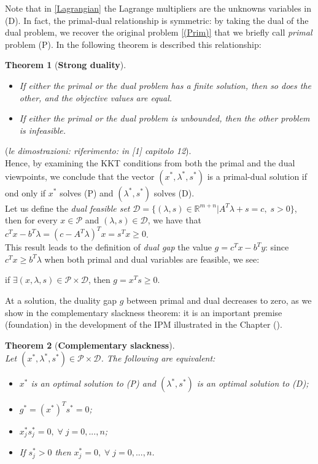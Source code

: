 \documentclass[a4paper,10 pt,titlepage,twoside]{book}
\theoremstyle{plain}
\newtheorem{thm}{Theorem}[chapter]
\theoremstyle{definition}
\theoremstyle{remark}
\begin{document}
Note that in \ref{Lagrangian} the Lagrange multipliers are the unknowns variables in (D). In fact, the primal-dual relationship is symmetric: by taking the dual of the dual problem, we recover the original problem \ref{(Prim)} that we briefly call \textit{primal} problem (P). In the following theorem is described this relationship:
\begin{thm}[\textbf{Strong duality}] 
	\begin{itemize}
		\
		\item If either the primal or the dual problem has a finite solution, then so does the other, and the objective values are equal.
		\item If either the primal or the dual problem is unbounded, then the other problem is infeasible.
	\end{itemize}
\end{thm}
(\textit{le dimostrazioni: riferimento: in [1] capitolo 12}).\\[0.5 cm] Hence, by examining the KKT conditions from both the primal and the dual viewpoints, we conclude that the vector $(x^{*},\lambda^{*},s^{*})$ is a primal-dual solution if ond only if $x^{*}$ solves (P) and $(\lambda^{*},s^{*})$ solves (D).\\[1cm]
Let us define the \textit{dual feasible set} $\mathcal{D}=\{(\lambda,s)\in\mathbb{R}^{m+n}| A^{T}\lambda+s= c,\;s>0\}$, then for every $x\in\mathcal{P}$ and $\left(\lambda,s\right)\in\mathcal{D}$, we have that $c^{T}x-b^{T}\lambda=\left(c-A^{T}\lambda\right)^{T}x=s^{T}x \geq0$.\\
This result leads to the definition of \textit{dual gap} the value $g = c^{T}x - b^{T}y$: since $c^{T}x\geq b^{T}\lambda$ when both primal and dual variables are feasible, we see:\begin{center}
	if $\exists(x,\lambda,s)\in\mathcal{P}\times\mathcal{D}$, then $g= x^{T}s \geq0$.
\end{center}
At a solution, the duality gap $g$ between primal and dual decreases to zero, as we show in the complementary slackness theorem: it is an important premise (foundation) in the development of the IPM illustrated in the Chapter ().
\begin{thm}[\textbf{Complementary slackness}] \ \\
	Let $(x^{*},\lambda^{*},s^{*})\in\mathcal{P}\times\mathcal{D}$. The following are equivalent:
	\begin{itemize}
		\item $x^{*}$ is an optimal solution to (P) and $(\lambda^{*},s^{*})$ is an optimal solution to (D);
		\item $g^{*} = (x^{*})^{T}s^{*}=0$;
		\item $x^{*}_{j}s^{*}_{j}=0,\;\forall\; j=0,...,n$;
		\item If $s^{*}_{j} > 0$ then $x^{*}_{j}= 0,\;\forall\; j=0,...,n$.
	\end{itemize}
\end{thm}
\end{document}
